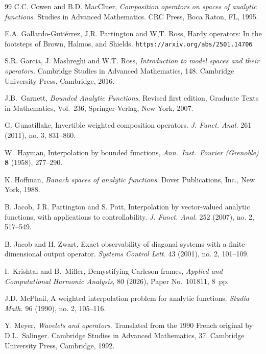 \documentclass[11pt]{amsart}
\theoremstyle{definition}
\theoremstyle{remark}
\numberwithin{equation}{section}
\begin{document}
\begin{thebibliography}{99}
C.C. Cowen and B.D. MacCluer,   {\em Composition operators on spaces of analytic functions}. Studies in Advanced Mathematics. CRC Press, Boca Raton, FL, 1995.



E.A. Gallardo-Guti\'errez, J,R. Partington and W,T. Ross,
Hardy operators: In the footsteps of Brown, Halmos, and Shields.
{\tt https://arxiv.org/abs/2501.14706}

S.R. Garcia, J. Mashreghi and W.T. Ross, {\em Introduction to model spaces and their operators.} Cambridge Studies in Advanced Mathematics, 148. Cambridge University Press, Cambridge, 2016.

J.B.~Garnett,
\emph{Bounded Analytic Functions},
Revised first edition,
Graduate Texts in Mathematics, Vol.~236,
Springer-Verlag, New York, 2007.



G. Gunatillake,   Invertible weighted composition operators.
{\em J. Funct. Anal.} 261 (2011), no. 3, 831--860.

W.~Hayman,
Interpolation by bounded functions,
{\em Ann.\ Inst.\ Fourier (Grenoble)} \textbf{8} (1958), 277--290.



K. Hoffman,
{\em Banach spaces of analytic functions}.
Dover Publications, Inc., New York, 1988.

B. Jacob, J.R. Partington and S. Pott,   Interpolation by vector-valued analytic functions, with applications to controllability. {\em J. Funct. Anal.} 252 (2007), no. 2, 517--549.

B. Jacob and H. Zwart,   Exact observability of diagonal systems with a finite-dimensional output operator. {\em Systems Control Lett.} 43 (2001), no. 2, 101--109.



I.~Krishtal and B.~Miller,
\newblock Demystifying Carleson frames,
\newblock \emph{Applied and Computational Harmonic Analysis}, 80 (2026), Paper No.\ 101811, 8~pp.



J.D. McPhail,   A weighted interpolation problem for analytic functions.
{\em Studia Math.} 96 (1990), no. 2, 105--116.

Y. Meyer, {\em Wavelets and operators}. Translated from the 1990 French original by D.L.~Salinger. Cambridge Studies in Advanced Mathematics, 37. Cambridge University Press, Cambridge, 1992.


\end{thebibliography}
\end{document}
